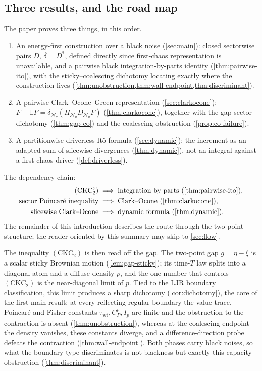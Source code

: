 \documentclass[reqno,final,11pt]{amsart}
\theoremstyle{plain}
\theoremstyle{definition}
\theoremstyle{remark}
\newcommand{\E}{\mathbb E}
\newcommand{\cN}{\mathcal N}
\newcommand{\DN}{D_{\cN_\theta}}
\newcommand{\divN}{\delta_{\cN_\theta}}
\newcommand{\CKC}{(\mathrm{CKC}_{2})}
\newcommand{\PiN}{\Pi_{\cN_\theta}}
\begin{document}
\subsection*{Three results, and the road map}
The paper proves three things, in this order.
\begin{enumerate}
\item An energy-first construction over a black noise
(\cref{sec:main}): closed sectorwise pairs $D$, $\delta=D^{*}$, defined
directly since first-chaos representation is unavailable, and a pairwise
black integration-by-parts identity (\cref{thm:pairwise-ito}), with the
sticky--coalescing dichotomy locating exactly where the construction lives
(\cref{thm:unobstruction,thm:wall-endpoint,thm:discriminant}).
\item A pairwise Clark--Ocone--Green representation
(\cref{sec:clarkocone}): $F-\E F=\divN(\PiN\DN F)$
(\cref{thm:clarkocone}), together with the gap-sector dichotomy
(\cref{thm:gap-co}) and the coalescing obstruction
(\cref{prop:co-failure}).
\item A partitionwise driverless It\^o formula (\cref{sec:dynamic}):
the increment as an adapted sum of slicewise divergences
(\cref{thm:dynamic}), not an integral against a first-chaos driver
(\cref{def:driverless}).
\end{enumerate}
The dependency chain:
\begin{align*}
  (\mathrm{CKC}_2^{\flat})
  &\;\Longrightarrow\;
  \text{integration by parts (\cref{thm:pairwise-ito})},\\
  \text{sector Poincar\'e inequality}
  &\;\Longrightarrow\;
  \text{Clark--Ocone (\cref{thm:clarkocone})},\\
  \text{slicewise Clark--Ocone}
  &\;\Longrightarrow\;
  \text{dynamic formula (\cref{thm:dynamic})}.
\end{align*}
The remainder of this introduction describes the route through the two-point
structure; the reader oriented by this summary may skip to \cref{sec:flow}.

The inequality $\CKC$ is then read off the gap. The two-point gap $g=\eta-\xi$ is
a scalar sticky Brownian motion (\cref{lem:gap-sticky}); its time-$T$ law splits
into a diagonal atom and a diffuse density $p$, and the one number that controls
$\CKC$ is the near-diagonal limit of $p$. Tied to the LJR boundary classification,
this limit produces a sharp dichotomy (\cref{cor:dichotomy}), the core of
the first main result: at every
reflecting-regular boundary the value-trace, Poincar\'e and Fisher constants
$\tau_{\mathrm{wt}},C^p_P,I_p$ are finite and the obstruction to the contraction
is absent (\cref{thm:unobstruction}), whereas at the coalescing endpoint the
density vanishes, these constants diverge, and a difference-direction probe
defeats the contraction (\cref{thm:wall-endpoint}). Both phases carry black
noises, so what the boundary type discriminates is not blackness but exactly
this capacity obstruction (\cref{thm:discriminant}).
\end{document}
